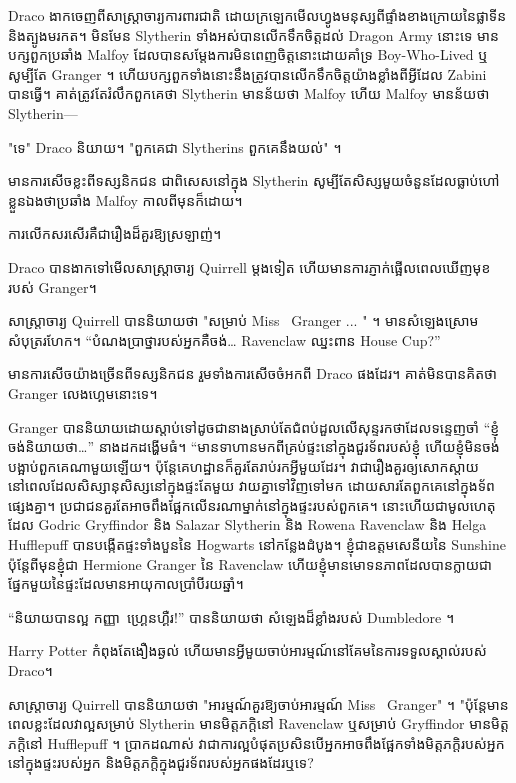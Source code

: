 {Draco ងាកចេញពីសាស្ត្រាចារ្យការពារជាតិ ដោយក្រឡេកមើលហ្វូងមនុស្សពីផ្ទាំងខាងក្រោយនៃផ្លាទីន និងត្បូងមរកត។ មិនមែន Slytherin ទាំងអស់បានលើកទឹកចិត្តដល់ Dragon Army នោះទេ មានបក្សពួកប្រឆាំង Malfoy ដែលបានសម្តែងការមិនពេញចិត្តនោះដោយគាំទ្រ Boy-Who-Lived ឬសូម្បីតែ Granger ។ ហើយបក្សពួកទាំងនោះនឹងត្រូវបានលើកទឹកចិត្តយ៉ាងខ្លាំងពីអ្វីដែល Zabini បានធ្វើ។ គាត់ត្រូវតែរំលឹកពួកគេថា Slytherin មានន័យថា Malfoy ហើយ Malfoy មានន័យថា Slytherin—

"ទេ" Draco និយាយ។ "ពួកគេជា Slytherins ពួកគេនឹងយល់" ។

មានការសើចខ្លះពីទស្សនិកជន ជាពិសេសនៅក្នុង Slytherin សូម្បីតែសិស្សមួយចំនួនដែលធ្លាប់ហៅខ្លួនឯងថាប្រឆាំង Malfoy កាលពីមុនក៏ដោយ។

ការលើកសរសើរគឺជារឿងដ៏គួរឱ្យស្រឡាញ់។

Draco បាន​ងាក​ទៅ​មើល​សាស្ត្រាចារ្យ Quirrell ម្ដង​ទៀត ហើយ​មាន​ការ​ភ្ញាក់​ផ្អើល​ពេល​ឃើញ​មុខ​របស់ Granger។

សាស្រ្តាចារ្យ Quirrell បាននិយាយថា "សម្រាប់ Miss ~Granger ... " ។ មាន​សំឡេង​ស្រោម​សំបុត្រ​រហែក។ “បំណងប្រាថ្នារបស់អ្នកគឺចង់… Ravenclaw ឈ្នះពាន House Cup?”

មានការសើចយ៉ាងច្រើនពីទស្សនិកជន រួមទាំងការសើចចំអកពី Draco ផងដែរ។ គាត់​មិន​បាន​គិត​ថា Granger លេង​ហ្គេម​នោះ​ទេ។

Granger បាននិយាយដោយស្តាប់ទៅដូចជានាងស្រាប់តែជំពប់ដួលលើសុន្ទរកថាដែលទន្ទេញចាំ “ខ្ញុំចង់និយាយថា…” នាងដកដង្ហើមធំ។ “មាន​ទាហាន​មក​ពី​គ្រប់​ផ្ទះ​នៅ​ក្នុង​ជួរ​ទ័ព​របស់​ខ្ញុំ ហើយ​ខ្ញុំ​មិន​ចង់​បង្អាប់​ពួកគេ​ណា​មួយ​ឡើយ។ ប៉ុន្តែគេហដ្ឋានក៏គួរតែរាប់រកអ្វីមួយដែរ។ វាជារឿងគួរឲ្យសោកស្ដាយ នៅពេលដែលសិស្សានុសិស្សនៅក្នុងផ្ទះតែមួយ វាយគ្នាទៅវិញទៅមក ដោយសារតែពួកគេនៅក្នុងទ័ពផ្សេងគ្នា។ ប្រជាជនគួរតែអាចពឹងផ្អែកលើនរណាម្នាក់នៅក្នុងផ្ទះរបស់ពួកគេ។ នោះហើយជាមូលហេតុដែល Godric Gryffindor និង Salazar Slytherin និង Rowena Ravenclaw និង Helga Hufflepuff បានបង្កើតផ្ទះទាំងបួននៃ Hogwarts នៅកន្លែងដំបូង។ ខ្ញុំជាឧត្តមសេនីយនៃ Sunshine ប៉ុន្តែពីមុនខ្ញុំជា Hermione Granger នៃ Ravenclaw ហើយខ្ញុំមានមោទនភាពដែលបានក្លាយជាផ្នែកមួយនៃផ្ទះដែលមានអាយុកាលប្រាំបីរយឆ្នាំ។

“និយាយបានល្អ កញ្ញា~ហ្គ្រេនហ្គឺរ!” បាននិយាយថា សំឡេងដ៏ខ្លាំងរបស់ Dumbledore ។

Harry Potter កំពុង​តែ​ងឿងឆ្ងល់ ហើយ​មាន​អ្វី​មួយ​ចាប់​អារម្មណ៍​នៅ​គែម​នៃ​ការ​ទទួល​ស្គាល់​របស់ Draco។

សាស្រ្តាចារ្យ Quirrell បាននិយាយថា "អារម្មណ៍គួរឱ្យចាប់អារម្មណ៍ Miss ~Granger" ។ "ប៉ុន្តែមានពេលខ្លះដែលវាល្អសម្រាប់ Slytherin មានមិត្តភក្តិនៅ Ravenclaw ឬសម្រាប់ Gryffindor មានមិត្តភក្តិនៅ Hufflepuff ។ ប្រាកដ​ណាស់ វា​ជា​ការ​ល្អ​បំផុត​ប្រសិន​បើ​អ្នក​អាច​ពឹង​ផ្អែក​ទាំង​មិត្ត​ភក្តិ​របស់​អ្នក​នៅ​ក្នុង​ផ្ទះ​របស់​អ្នក និង​មិត្ត​ភក្តិ​ក្នុង​ជួរ​ទ័ព​របស់​អ្នក​ផង​ដែរ​ឬ​ទេ?

}
